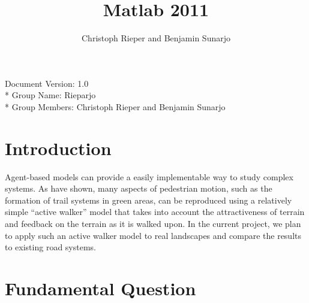 \documentclass[a4paper, DIV11, abstracton]{scrartcl}
\begin{document}
\title{Matlab 2011}
\author{Christoph Rieper and Benjamin Sunarjo}


\maketitle

Document Version: 1.0\\*
Group Name: Rieparjo\\*
Group Members: Christoph Rieper and Benjamin Sunarjo


\setcounter{page}{1}	%
\section{Introduction}


Agent-based models can provide a easily implementable way to study complex systems. As \citet{helbing:1997} have shown, many aspects of pedestrian motion, such as the formation of trail systems in green areas, can be reproduced using a relatively simple ``active walker'' model that takes into account the attractiveness of terrain and feedback on the terrain as it is walked upon. In the current project, we plan to apply such an active walker model to real landscapes and compare the results to existing road systems.



\section{Fundamental Question}

\end{document}
